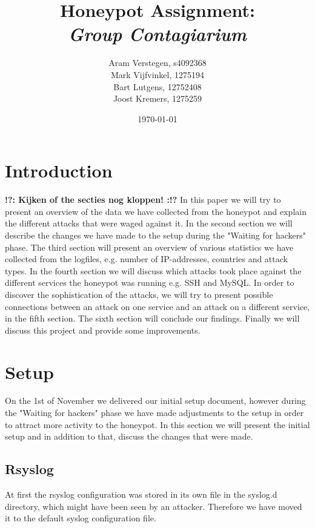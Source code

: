 \documentclass[11pt]{article}
\title{\textbf{Honeypot Assignment: \\ \emph{Group Contagiarium}}}
\author{Aram Verstegen, s4092368 \\
	 Mark Vijfvinkel, 1275194 \\
	 Bart Lutgens, 12752408 \\
	Joost Kremers, 1275259}
\date{\today}
\newcommand{\tocheck}[1]{{\bf !?: #1 :!?}}
\begin{document}
\maketitle


\section{Introduction}
\tocheck{Kijken of the secties nog kloppen!}
In this paper we will try to present an overview of the data we have collected from the honeypot and explain the different attacks that were waged against it. 
In the second section we will describe the changes we have made to the setup during the "Waiting for hackers" phase. 
The third section will present an overview of various statistics we have collected from the logfiles, e.g. number of IP-addresses, countries and attack types. 
In the fourth section we will discuss which attacks took place against the different services the honeypot was running e.g. SSH and MySQL.
In order to discover the sophistication of the attacks, we will try to present possible connections between an attack on one service and an attack on a different service, in the fifth section.
The sixth section will conclude our findings. 
Finally we will discuss this project and provide some improvements. 


\section{Setup}
\label{Setup}

On the 1st of November we delivered our initial setup document, however during the "Waiting for hackers" phase we have made adjustments to the setup in order to attract more activity to the honeypot. In this section we will present the initial setup and in addition to that, discuss the changes that were made.


\subsection{Rsyslog}
At first the rsyslog configuration was stored in its own file in the syslog.d directory, which might have been seen by an attacker.
Therefore we have moved it to the default syslog configuration file. 
\end{document}
